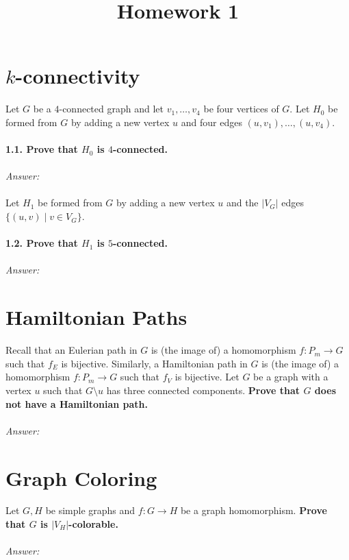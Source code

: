 \documentclass{article}
\title{Homework 1}
\author{}
\begin{document}
  \maketitle

  \section{$k$-connectivity}
    Let $G$ be a $4$-connected graph and let $v_1,\ldots, v_4$ be four vertices of $G$.
    Let $H_0$ be formed from $G$ by adding a new vertex $u$ and four edges $(u,v_1), \ldots , (u,v_4)$.
    \\\\
    \textbf{1.1. Prove that $H_0$ is $4$-connected.}
    \\\\
    \textit{Answer:}
    \\\\
    
    Let $H_1$ be formed from $G$ by adding a new vertex $u$ and the $|V_G|$ edges $\{(u,v) \mid v\in V_G\}$.
    \\\\
    \textbf{1.2. Prove that $H_1$ is $5$-connected.}
    \\\\
    \textit{Answer:}
    

  \section{Hamiltonian Paths}
  Recall that an Eulerian path in $G$ is (the image of) a homomorphism $f:P_m\to G$ such that $f_E$ is bijective.
  Similarly, a Hamiltonian path in $G$ is (the image of) a homomorphism $f:P_m\to G$ such that $f_V$ is bijective.
  Let $G$ be a graph with a vertex $u$ such that $G\setminus u$ has three connected components.
  \textbf{Prove that $G$ does not have a Hamiltonian path.}
  \\\\
  \textit{Answer:}
    
  \section{Graph Coloring}
    Let $G, H$ be simple graphs and $f:G\to H$ be a graph homomorphism.
    \textbf{Prove that $G$ is $|V_H|$-colorable.}
  \\\\
  \textit{Answer:}
    

    
\end{document}
